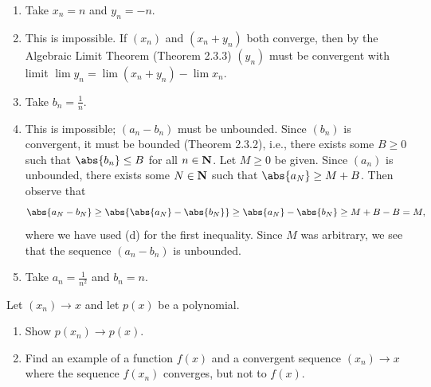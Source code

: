 \documentclass{lew98_solutions}
\begin{document}
\begin{solution}
    \begin{enumerate}
        \item Take \( x_n = n \) and \( y_n = -n \).

        \item This is impossible. If \( (x_n) \) and \( (x_n + y_n) \) both converge, then by the Algebraic Limit Theorem (Theorem 2.3.3) \( (y_n) \) must be convergent with limit \( \lim y_n = \lim (x_n + y_n) - \lim x_n \).

        \item Take \( b_n = \tfrac{1}{n} \).

        \item This is impossible; \( (a_n - b_n) \) must be unbounded. Since \( (b_n) \) is convergent, it must be bounded (Theorem 2.3.2), i.e., there exists some \( B \geq 0 \) such that \( \abs{b_n} \leq B \) for all \( n \in \mathbf{N} \). Let \( M \geq 0 \) be given. Since \( (a_n) \) is unbounded, there exists some \( N \in \mathbf{N} \) such that \( \abs{a_N} \geq M + B \). Then observe that
        \[
            \abs{a_N - b_N} \geq \abs{\abs{a_N} - \abs{b_N}} \geq \abs{a_N} - \abs{b_N} \geq M + B - B = M,
        \]
        where we have used  (d) for the first inequality. Since \( M \) was arbitrary, we see that the sequence \( (a_n - b_n) \) is unbounded.

        \item Take \( a_n = \tfrac{1}{n^2} \) and \( b_n = n \).
    \end{enumerate}
\end{solution}

\begin{exercise}
\label{ex:2.3.8}
    Let \( (x_n) \to x \) and let \( p(x) \) be a polynomial.
    \begin{enumerate}
        \item Show \( p(x_n) \to p(x) \).

        \item Find an example of a function \( f(x) \) and a convergent sequence \( (x_n) \to x \) where the sequence \( f(x_n) \) converges, but not to \( f(x) \).
    \end{enumerate}
\end{exercise}
\end{document}
